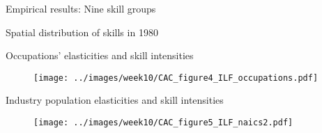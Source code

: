 \documentclass[10pt,notes=hide]{beamer}
\begin{document}
\begin{frame}{Empirical results: Nine skill groups}
\begin{table}
\begin{centering}
\resizebox{.9\textwidth}{!}{}
\par\end{centering}
\end{table}
\end{frame}
\begin{frame}{Spatial distribution of skills in 1980}
\begin{table}
\begin{centering}
\resizebox{\textwidth}{!}{}
\par\end{centering}
\end{table}
\end{frame}
\begin{frame}{Occupations' elasticities and skill intensities\label{OccupationsElasticitiesScatter}}
\begin{figure}
\texttt{[image: ../images/week10/CAC\_figure4\_ILF\_occupations.pdf]}
\end{figure}
\begin{center}
\par\end{center}
\end{frame}
\begin{frame}{Industry population elasticities and skill intensities\label{IndustriesElasticitiesScatter}}
\begin{figure}
\texttt{[image: ../images/week10/CAC\_figure5\_ILF\_naics2.pdf]}
\end{figure}
\begin{center}
\par\end{center}
\end{frame}
\end{document}
